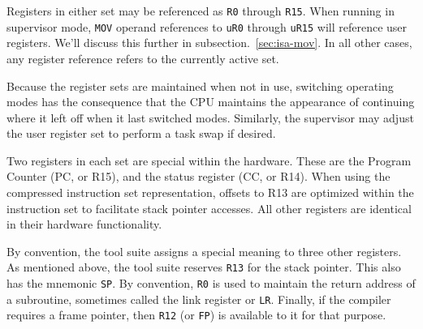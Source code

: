 \documentclass{gqtekspec}
\begin{document}
Registers in either set may be referenced as {\tt R0} through {\tt R15}.
When running in supervisor mode, {\tt MOV} operand references to {\tt uR0}
through {\tt uR15} will reference user registers.
We'll discuss this further in subsection.~\ref{sec:isa-mov}.
In all other cases, any register reference refers to the currently active set.

Because the register sets are maintained when not in use, switching operating
modes has the consequence that the CPU maintains the appearance of continuing
where it left off when it last switched modes.  Similarly, the supervisor
may adjust the user register set to perform a task swap if desired.

Two registers in each set are special within the hardware.  These are the
Program Counter (PC, or R15), and the status register (CC, or R14).  When
using the compressed instruction set representation, offsets to R13 are
optimized within the instruction set to facilitate stack pointer accesses.
All other registers are identical in their hardware functionality.

By convention, the tool suite assigns a special meaning to three other
registers.  As mentioned above, the tool suite reserves {\tt R13} for the
stack pointer.  This also has the mnemonic {\tt SP}.  By convention, {\tt R0}
is used to maintain the return address of a subroutine, sometimes called the
link register or {\tt LR}.  Finally, if the compiler requires a frame pointer,
then {\tt R12} (or {\tt FP}) is available to it for that purpose.
\end{document}
